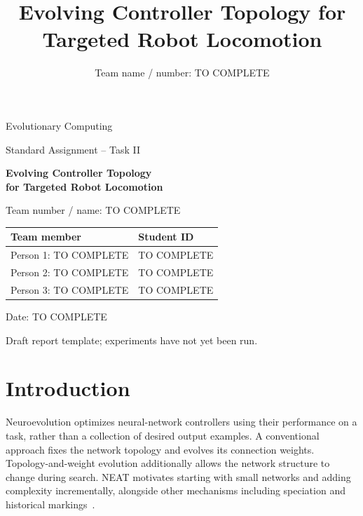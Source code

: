 \documentclass[sigconf,nonacm]{acmart}
\title{Evolving Controller Topology for Targeted Robot Locomotion}
\author{Team name / number: TO COMPLETE}
\affiliation{\institution{Evolutionary Computing, 2026}\country{The Netherlands}}
\begin{document}
\onecolumn
\thispagestyle{empty}
\begin{center}
\vspace*{20mm}
{\LARGE Evolutionary Computing\par}
\vspace{6mm}
{\Large Standard Assignment -- Task II\par}
\vspace{12mm}
{\huge\bfseries Evolving Controller Topology\\for Targeted Robot Locomotion\par}
\vspace{15mm}
{\large Team number / name: TO COMPLETE\par}
\vspace{8mm}
\begin{tabular}{ll}
\toprule
Team member & Student ID\\
\midrule
Person 1: TO COMPLETE & TO COMPLETE\\
Person 2: TO COMPLETE & TO COMPLETE\\
Person 3: TO COMPLETE & TO COMPLETE\\
\bottomrule
\end{tabular}
\vspace{12mm}
\par Date: TO COMPLETE\par
\vfill
\par Draft report template; experiments have not yet been run.\par
\end{center}
\clearpage
\twocolumn
\setcounter{page}{1}
\maketitle


\section{Introduction}
Neuroevolution optimizes neural-network controllers using their performance on a
task, rather than a collection of desired output examples. A conventional
approach fixes the network topology and evolves its connection weights.
Topology-and-weight evolution additionally allows the network structure to
change during search. NEAT motivates starting with small networks and adding
complexity incrementally, alongside other mechanisms including speciation and
historical markings~\cite{stanley2002}.
\end{document}
